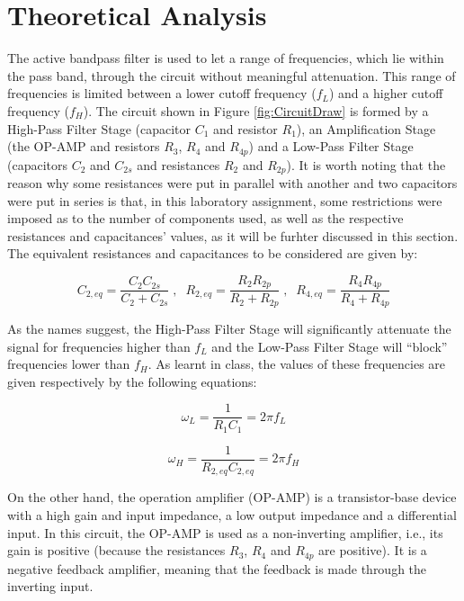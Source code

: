 \section{Theoretical Analysis} \label{sec:analysis}

The active bandpass filter is used to let a range of frequencies, which lie within the pass band, through the circuit without meaningful attenuation. This range of frequencies is limited between a lower cutoff frequency ($f_L$) and a higher cutoff frequency ($f_H$). The circuit shown in Figure \ref{fig:CircuitDraw} is formed by a High-Pass Filter Stage (capacitor $C_1$ and resistor $R_1$), an Amplification Stage (the OP-AMP and resistors $R_3$, $R_4$ and $R_{4p}$) and a Low-Pass Filter Stage (capacitors $C_2$ and $C_{2s}$ and resistances $R_2$ and $R_{2p}$). It is worth noting that the reason why some resistances were put in parallel with another and two capacitors were put in series is that, in this laboratory assignment, some restrictions were imposed as to the number of components used, as well as the respective resistances and capacitances' values, as it will be furhter discussed in this section. The equivalent resistances and capacitances to be considered are given by:

\begin{equation}\label{eq:equivalent_resistances_capacitances}
  C_{2,eq}=\frac{C_2C_{2s}}{C_2+C_{2s}}\;,\;\;R_{2,eq}=\frac{R_2R_{2p}}{R_2+R_{2p}}\;,\;\;R_{4,eq}=\frac{R_4R_{4p}}{R_4+R_{4p}}
\end{equation}

As the names suggest, the High-Pass Filter Stage will significantly attenuate the signal for frequencies higher than $f_L$ and the Low-Pass Filter Stage will ``block'' frequencies lower than $f_H$. As learnt in class, the values of these frequencies are given respectively by the following equations:

\begin{equation}\label{eq:lower_cutoff_frequency}
  \omega_L=\frac{1}{R_1C_1}=2\pi f_L
\end{equation}

\begin{equation}\label{eq:higher_cutoff_frequency}
  \omega_H=\frac{1}{R_{2,eq}C_{2,eq}}=2\pi f_H
\end{equation}

On the other hand, the operation amplifier (OP-AMP) is a transistor-base device with a high gain and input impedance, a low output impedance and a differential input. In this circuit, the OP-AMP is used as a non-inverting amplifier, i.e., its gain is positive (because the resistances $R_3$, $R_4$ and $R_{4p}$ are positive). It is a negative feedback amplifier, meaning that the feedback is made through the inverting input.

